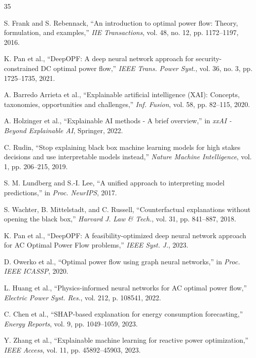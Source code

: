 \documentclass[journal,12pt,onecolumn]{IEEEtran}
\begin{document}
\begin{thebibliography}{35}

S. Frank and S. Rebennack, ``An introduction to optimal power flow: Theory, formulation, and examples,'' \emph{IIE Transactions}, vol. 48, no. 12, pp. 1172--1197, 2016.

K. Pan et al., ``DeepOPF: A deep neural network approach for security-constrained DC optimal power flow,'' \emph{IEEE Trans. Power Syst.}, vol. 36, no. 3, pp. 1725--1735, 2021.

A. Barredo Arrieta et al., ``Explainable artificial intelligence (XAI): Concepts, taxonomies, opportunities and challenges,'' \emph{Inf. Fusion}, vol. 58, pp. 82--115, 2020.

A. Holzinger et al., ``Explainable AI methods - A brief overview,'' in \emph{xxAI - Beyond Explainable AI}, Springer, 2022.

C. Rudin, ``Stop explaining black box machine learning models for high stakes decisions and use interpretable models instead,'' \emph{Nature Machine Intelligence}, vol. 1, pp. 206--215, 2019.

S. M. Lundberg and S.-I. Lee, ``A unified approach to interpreting model predictions,'' in \emph{Proc. NeurIPS}, 2017.

S. Wachter, B. Mittelstadt, and C. Russell, ``Counterfactual explanations without opening the black box,'' \emph{Harvard J. Law \& Tech.}, vol. 31, pp. 841--887, 2018.

K. Pan et al., ``DeepOPF: A feasibility-optimized deep neural network approach for AC Optimal Power Flow problems,'' \emph{IEEE Syst. J.}, 2023.

D. Owerko et al., ``Optimal power flow using graph neural networks,'' in \emph{Proc. IEEE ICASSP}, 2020.

L. Huang et al., ``Physics-informed neural networks for AC optimal power flow,'' \emph{Electric Power Syst. Res.}, vol. 212, p. 108541, 2022.

C. Chen et al., ``SHAP-based explanation for energy consumption forecasting,'' \emph{Energy Reports}, vol. 9, pp. 1049--1059, 2023.

Y. Zhang et al., ``Explainable machine learning for reactive power optimization,'' \emph{IEEE Access}, vol. 11, pp. 45892--45903, 2023.


\end{thebibliography}
\end{document}
